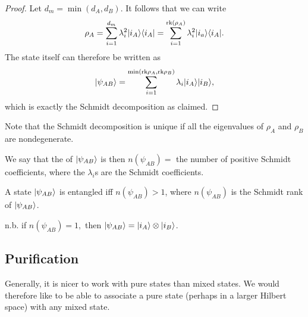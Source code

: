 \begin{proof}
    Let $d_m=\min(d_A,d_B)$. It follows that we can write
    \begin{equation}
        \rho_A = \sum_{i=1}^{d_m} \lambda_i^2 \lvert i_A\rangle\langle i_A\rvert = \sum_{i=1}^{\text{rk}(\rho_A)}\lambda_i^2 \lvert i_a\rangle\langle i_A\rvert.
    \end{equation}
    The state itself can therefore be written as
    \begin{equation}
        \lvert\psi_{AB}\rangle=\sum_{i=1}^{\min(\text{rk}\rho_A,\text{rk}\rho_B)} \lambda_i \lvert i_A\rangle \lvert i_B\rangle,
    \end{equation}
    which is exactly the Schmidt decomposition as claimed.
\end{proof}

Note that the Schmidt decomposition is unique if all the eigenvalues of $\rho_A$ and $\rho_B$ are nondegenerate. 
\begin{defn}
    We say that the  of $\lvert\psi_{AB}\rangle$ is then $n(\psi_{AB})={}$ the number of positive Schmidt coefficients, where the $\lambda_i$s are the Schmidt coefficients.
\end{defn}

\begin{thm}
    A state $\lvert\psi_{AB}\rangle$ is entangled iff $n(\psi_{AB}) >1$, where $n(\psi_{AB})$ is the Schmidt rank of $\lvert\psi_{AB}\rangle$.
\end{thm}
n.b. if $n(\psi_{AB})=1,$ then $\lvert\psi_{AB}\rangle=\lvert i_A\rangle\otimes \lvert i_B\rangle$.

\subsection*{Purification} Generally, it is nicer to work with pure states than mixed states. We would therefore like to be able to associate a pure state (perhaps in a larger Hilbert space) with any mixed state.

